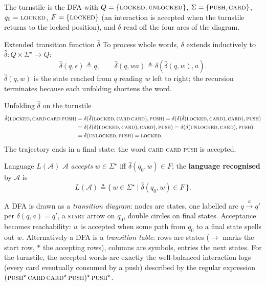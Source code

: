The turnstile is the DFA with $Q = \{\textsc{locked}, \textsc{unlocked}\}$, $\Sigma = \{\textsc{push}, \textsc{card}\}$, $q_0 = \textsc{locked}$, $F = \{\textsc{locked}\}$ (an interaction is accepted when the turnstile returns to the locked position), and $\delta$ read off the four arcs of the diagram.

\begin{definitionbox}{Extended transition function $\hat{\delta}$}
To process whole words, $\delta$ extends inductively to $\hat{\delta} : Q \times \Sigma^\star \to Q$:
\[
  \hat{\delta}(q, \epsilon) \triangleq q, \qquad \hat{\delta}(q, wa) \triangleq \delta(\hat{\delta}(q, w), a).
\]
$\hat{\delta}(q, w)$ is the state reached from $q$ reading $w$ left to right; the recursion terminates because each unfolding shortens the word.
\end{definitionbox}

\begin{examplebox}{Unfolding $\hat{\delta}$ on the turnstile}
\begin{align*}
  \hat{\delta}(\textsc{locked}, \textsc{card}\,\textsc{card}\,\textsc{push})
  &= \delta(\hat{\delta}(\textsc{locked}, \textsc{card}\,\textsc{card}), \textsc{push})
   = \delta(\delta(\hat{\delta}(\textsc{locked}, \textsc{card}), \textsc{card}), \textsc{push}) \\
  &= \delta(\delta(\delta(\textsc{locked}, \textsc{card}), \textsc{card}), \textsc{push})
   = \delta(\delta(\textsc{unlocked}, \textsc{card}), \textsc{push}) \\
  &= \delta(\textsc{unlocked}, \textsc{push}) = \textsc{locked}.
\end{align*}
The trajectory ends in a final state: the word \textsc{card card push} is accepted.
\end{examplebox}

\begin{definitionbox}{Language $L(\mathcal{A})$}
$\mathcal{A}$ \emph{accepts} $w \in \Sigma^\star$ iff $\hat{\delta}(q_0, w) \in F$; the \textbf{language recognised} by $\mathcal{A}$ is
\[
  L(\mathcal{A}) \triangleq \{\, w \in \Sigma^\star \mid \hat{\delta}(q_0, w) \in F \,\}.
\]
\end{definitionbox}

A DFA is drawn as a \emph{transition diagram}: nodes are states, one labelled arc $q \xrightarrow{a} q'$ per $\delta(q, a) = q'$, a \textsc{start} arrow on $q_0$, double circles on final states. Acceptance becomes reachability: $w$ is accepted when some path from $q_0$ to a final state spells out $w$. Alternatively a DFA is a \emph{transition table}: rows are states ($\rightarrow$ marks the start row, $\ast$ the accepting rows), columns are symbols, entries the next states. For the turnstile, the accepted words are exactly the well-balanced interaction logs (every card eventually consumed by a push) described by the regular expression $(\textsc{push}^\star\,\textsc{card}\,\textsc{card}^\star\,\textsc{push})^\star\,\textsc{push}^\star$.

